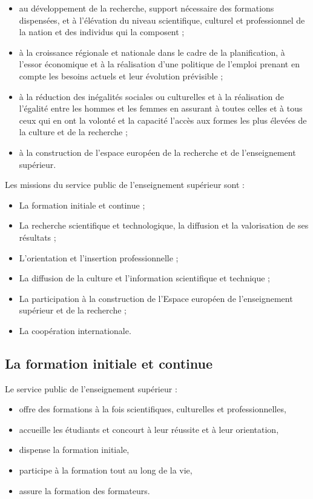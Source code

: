\begin{itemize}
	\item au développement de la recherche, support nécessaire des formations dispensées, et à l'élévation du niveau scientifique, culturel et professionnel de la nation et des individus qui la composent ;
	\item à la croissance régionale et nationale dans le cadre de la planification, à l'essor économique et à la réalisation d'une politique de l'emploi prenant en compte les besoins actuels et leur évolution prévisible ;
	\item à la réduction des inégalités sociales ou culturelles et à la réalisation de l'égalité entre les hommes et les femmes en assurant à toutes celles et à tous ceux qui en ont la volonté et la capacité l'accès aux formes les plus élevées de la culture et de la recherche ;
	\item à la construction de l'espace européen de la recherche et de l'enseignement supérieur.
\end{itemize}
\medskip

Les missions du service public de l'enseignement supérieur sont :
\medskip

\begin{itemize}
	\item La formation initiale et continue ;
	\item La recherche scientifique et technologique, la diffusion et la valorisation de ses résultats ;
	\item L'orientation et l'insertion professionnelle ;
	\item La diffusion de la culture et l'information scientifique et technique ;
	\item La participation à la construction de l'Espace européen de l'enseignement supérieur et de la recherche ;
	\item La coopération internationale.
\end{itemize}

\subsection{La formation initiale et continue}
Le service public de l'enseignement supérieur :
\medskip

\begin{itemize}
	\item [\textbullet] offre des formations à la fois scientifiques, culturelles et professionnelles,
	\item [\textbullet] accueille les étudiants et concourt à leur réussite et à leur orientation,
	\item [\textbullet] dispense la formation initiale,
	\item [\textbullet] participe à la formation tout au long de la vie,
	\item [\textbullet] assure la formation des formateurs.
\end{itemize}
\medskip

